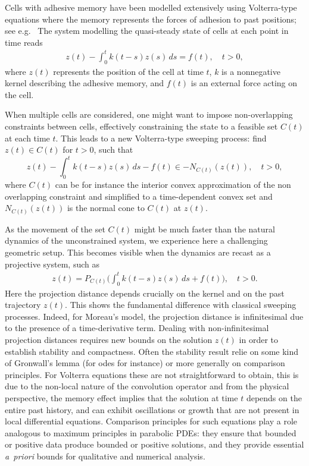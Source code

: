 \documentclass[]{jnsao}
\begin{document}
Cells with adhesive memory have been modelled extensively using Volterra-type equations where the memory 
represents the forces of adhesion to past positions; see e.g.~\cite{OelzSch10,PreVi,Manhart2015,MiOel.1,MiOel.2,MiOel.3,MiOel.4} 
The system modelling the quasi-steady state of cells at each point in time reads 
\begin{align*}
  z(t) - \int_0^t k(t-s) z(s)\,ds = f(t), \quad t > 0,
\end{align*}
where $z(t)$ represents the position of the cell at time $t$, $k$ is a 
nonnegative kernel describing the adhesive memory, and $f(t)$ is an external force acting on the cell.

When multiple cells are considered, one might want to impose non-overlapping constraints between cells, effectively constraining the state to a feasible set $C(t)$ at each time $t$. 
This leads to a new Volterra-type sweeping process: find $z(t) \in C(t)$ for $t>0$, such that
$$
z(t) - \int_0^t k(t-s) z(s)\,ds - f(t) \in -N_{C(t)}(z(t)),\quad t > 0,
$$
where $C(t)$ can be for instance the 
interior convex approximation of the non overlapping constraint 
and simplified to a time-dependent convex set and $N_{C(t)}(z(t))$ is the normal cone to $C(t)$ at $z(t)$.

As the movement of the set $C(t)$ might be much faster than the natural dynamics of the unconstrained 
system, we experience here a challenging geometric setup. This becomes visible when the dynamics are 
recast as a projective system, such as 
\begin{align*}
  z(t) = P_{C(t)}\Big( \int_0^t k(t-s) z(s)\,ds + f(t) \Big), \quad t > 0.
\end{align*}
Here the projection distance depends crucially on the kernel and on the past trajectory $z(t)$.
This shows the fundamental difference with  classical sweeping processes. Indeed, for Moreau's model,
  the projection distance is infinitesimal due to the presence of a time-derivative term.
Dealing with non-infinitesimal projection distances requires new bounds on the solution $z(t)$ in order to 
establish stability and compactness. Often the stability result 
relie on some kind of Gronwall's lemma (for odes for instance) or more generally on comparison principles.
For Volterra equations these are not straightforward to obtain, this is due to the non-local nature of the convolution operator
and from the physical perspective, the memory effect implies that the solution at time $t$ depends on the entire past history,
and can exhibit oscillations or growth that are not present in local differential equations.
Comparison principles for such equations play a 
role analogous to maximum principles in parabolic PDEs: they ensure that bounded or positive data produce 
bounded or positive solutions, and they provide essential \emph{a~priori} bounds for qualitative and numerical analysis.
 
\end{document}
